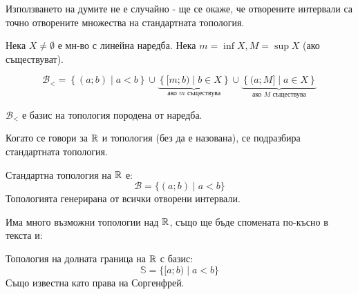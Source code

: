 Използването на думите не е случайно - ще се окаже, че отворените интервали са точно отворените множества на стандартната топология.
\begin{definition}
    Нека $X \neq \emptyset$ е мн-во с линейна наредба. Нека $m=\inf X, M=\sup X$ (ако съществуват). 

    \begin{equation*}
        \mathcal B_< = \left\{(a;b) \mid a < b\right\} \cup \underbrace{\left\{ [m; b) \mid b \in X \right\}}_{\text{ако $m$ съществува}} \cup \underbrace{\left\{ (a; M] \mid a \in X \right\}}_{\text{ако $M$ съществува}}
    \end{equation*}
\end{definition}
\begin{notation}
    $\mathcal B_<$ е базис на топология породена от наредба.
\end{notation}

Когато се говори за ${\mathbb{R}}$ и топология (без да е назована), се подразбира стандартната топология.
\begin{definition}
    Стандартна топология на ${\mathbb{R}}$ е:
    \begin{equation*}
        \mathcal B = \{(a;b) \mid a<b\}
    \end{equation*}
    Топологията генерирана от всички отворени интервали.
\end{definition}
Има много възможни топологии над ${\mathbb{R}}$, също ще бъде спомената по-късно в текста и:
\begin{definition}
    Топология на долната граница на ${\mathbb{R}}$ с базис:
    \begin{equation*}
       \mathbb S = \{[a; b)\mid a < b\}
    \end{equation*}
    Също известна като права на Соргенфрей.
\end{definition}

